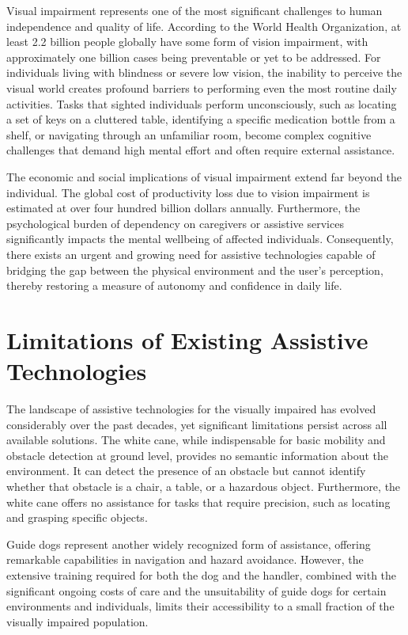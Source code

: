 \documentclass[12pt,a4paper]{report}
\begin{document}
Visual impairment represents one of the most significant challenges to human independence and quality of life. According to the World Health Organization, at least 2.2 billion people globally have some form of vision impairment, with approximately one billion cases being preventable or yet to be addressed. For individuals living with blindness or severe low vision, the inability to perceive the visual world creates profound barriers to performing even the most routine daily activities. Tasks that sighted individuals perform unconsciously, such as locating a set of keys on a cluttered table, identifying a specific medication bottle from a shelf, or navigating through an unfamiliar room, become complex cognitive challenges that demand high mental effort and often require external assistance.

The economic and social implications of visual impairment extend far beyond the individual. The global cost of productivity loss due to vision impairment is estimated at over four hundred billion dollars annually. Furthermore, the psychological burden of dependency on caregivers or assistive services significantly impacts the mental wellbeing of affected individuals. Consequently, there exists an urgent and growing need for assistive technologies capable of bridging the gap between the physical environment and the user's perception, thereby restoring a measure of autonomy and confidence in daily life.

\section{Limitations of Existing Assistive Technologies}

The landscape of assistive technologies for the visually impaired has evolved considerably over the past decades, yet significant limitations persist across all available solutions. The white cane, while indispensable for basic mobility and obstacle detection at ground level, provides no semantic information about the environment. It can detect the presence of an obstacle but cannot identify whether that obstacle is a chair, a table, or a hazardous object. Furthermore, the white cane offers no assistance for tasks that require precision, such as locating and grasping specific objects.

Guide dogs represent another widely recognized form of assistance, offering remarkable capabilities in navigation and hazard avoidance. However, the extensive training required for both the dog and the handler, combined with the significant ongoing costs of care and the unsuitability of guide dogs for certain environments and individuals, limits their accessibility to a small fraction of the visually impaired population.
\end{document}
